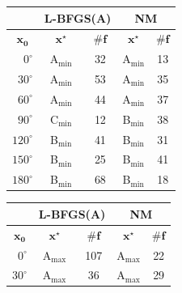\begin{minipage}{\textwidth}
	\begin{minipage}[b]{0.4\textwidth}
		\bgroup
		\setlength\tabcolsep{3mm}
		\def\arraystretch{1.5}%
		\begin{tabular}{|r|cc|cc|}
			\hline
			& \multicolumn{2}{c|}{L-BFGS(A)} & \multicolumn{2}{c|}{NM} \\ \hline
			\multicolumn{1}{|c|}{$\mathbf{x_0}$}& $\mathbf{x^\star}$ & $ \boldsymbol{\#f} $ & $\mathbf{x^\star}$ & $ \boldsymbol{\#f} $ \\ \hline
			$ 0^\circ $ 		&      A$_{\min}$           &     32     &    	A$_{\min}$   &  13 \\ 
			$ 30^\circ $ 		&      A$_{\min}$     		&     53     &    	A$_{\min}$   &  35 \\ 
			$ 60^\circ $ 		&      A$_{\min}$     		&     44     &    	A$_{\min}$   &  37 \\ 
			$ 90^\circ $ 		&      C$_{\min}$     		&     12     &    	B$_{\min}$   &  38 \\ 
			$ 120^\circ $ 		&      B$_{\min}$     		&     41     &      B$_{\min}$   &  31 \\ 
			$ 150^\circ $ 		&      B$_{\min}$     		&     25     &  	B$_{\min}$   &  41 \\
			$ 180^\circ $ 		&      B$_{\min}$     		&     68     &  	B$_{\min}$   &  18 \\ \hline
		\end{tabular}
		\vspace{2mm}
		\label{tab:elip2min}
		\egroup
	\end{minipage}%
	\begin{minipage}[b]{0.15\textwidth}
		\centering
		\hspace{1mm}
	\end{minipage}%
	\begin{minipage}[b]{0.4\textwidth}
		\bgroup
		\setlength\tabcolsep{3mm}
		\def\arraystretch{1.5}%
		\begin{tabular}{|r|cc|cc|}
			\hline
			& \multicolumn{2}{c|}{L-BFGS(A)} & \multicolumn{2}{c|}{NM} \\ \hline
			\multicolumn{1}{|c|}{$\mathbf{x_0}$}& $\mathbf{x^\star}$ & $ \boldsymbol{\#f} $ & $\mathbf{x^\star}$ & $ \boldsymbol{\#f} $ \\ \hline
			$ 0^\circ $ 		&      A$_{\max}$           &     107    &    	A$_{\max}$   &  22 \\ 
			$ 30^\circ $ 		&      A$_{\max}$     		&     36     &    	A$_{\max}$   &  29 \\ 

\end{tabular}
\end{minipage}
\end{minipage}
